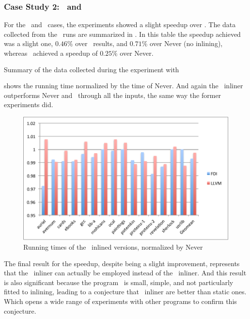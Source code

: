 \subsubsection{Case Study 2: \bzip\  and \gzip}

For the \bzip\ and \gzip\ cases, the experiments showed a slight speedup over \llvm. The data collected from the \bzip\ runs are summarized in . In this table the speedup achieved was a slight one, $0.46 \%$ over \llvm\ results, and $0.71 \%$ over Never (no inlining), whereas \llvm\ achieved a speedup of $0.25 \%$ over Never.

\begin{table}
  \centering
  \begin{tiny}
  
  \end{tiny}
  \caption{Summary of the data collected during the experiment with \bzip}
  \label{tab:speedupb}
\end{table}

 shows the running time normalized by the time of Never. And again the \FDI\ inliner outperforms Never and \llvm\ through all the inputs, the same way the former experiments did. %

\begin{figure}
  \centering
  \includegraphics[width=1.00\linewidth]{Figures/speedupbzipall}
  \caption{Running times of the \bzip\ inlined versions, normalized by Never}
  \label{fig:speedup}
\end{figure}

The final result for the speedup, despite being a slight improvement, represents that the \FDI\ inliner can actually be employed instead of the \llvm\ inliner. And this result is also significant because the program \bzip\ is small, simple, and not particularly fitted to inlining, leading to a conjecture that \FDI\ inliner are better than static ones. Which opens a wide range of experiments with other programs to confirm this conjecture.

